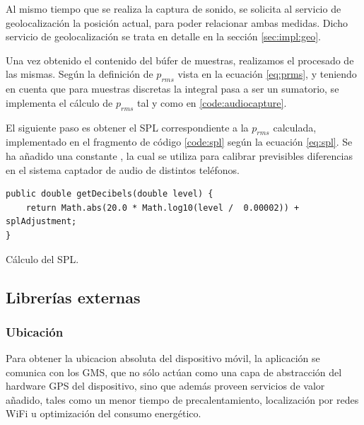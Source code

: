 Al mismo tiempo que se realiza la captura de sonido, se solicita al servicio de geolocalización la posición actual, para poder relacionar ambas medidas. Dicho servicio de geolocalización se trata en detalle en la sección \ref{sec:impl:geo}.

Una vez obtenido el contenido del búfer de muestras, realizamos el procesado de las mismas. Según la definición de $p_{rms}$ vista en la ecuación \ref{eq:prms}, y teniendo en cuenta que para muestras discretas la integral pasa a ser un sumatorio, se implementa el cálculo de $p_{rms}$ tal y como en \ref{code:audiocapture}.

El siguiente paso es obtener el \ac{SPL} correspondiente a la $p_{rms}$ calculada, implementado en el fragmento de código \autoref{code:spl} según la ecuación \ref{eq:spl}. Se ha añadido una constante , la cual se utiliza para calibrar previsibles diferencias en el sistema captador de audio de distintos teléfonos.

\begin{listing}[h] 
\begin{verbatim}
public double getDecibels(double level) {
    return Math.abs(20.0 * Math.log10(level /  0.00002)) + splAdjustment;
}
\end{verbatim}
\caption{Cálculo del SPL.}
\label{code:spl}
\end{listing}

\subsection{Librerías externas}
\subsubsection{Ubicación}
\label{sec:libext}
\label{sec:impl:geo}
Para obtener la ubicacion absoluta del dispositivo móvil, la aplicación se comunica con los \ac{GMS}, que no sólo actúan como una capa de abstracción del hardware GPS del dispositivo, sino que además proveen servicios de valor añadido, tales como un menor tiempo de precalentamiento, localización por redes WiFi u optimización del consumo energético.

